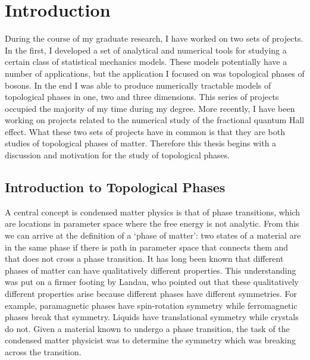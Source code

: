\chapter{Introduction}

During the course of my graduate research, I have worked on two sets of projects. In the first, I developed a set of analytical and numerical tools for studying a certain class of statistical mechanics models. These models potentially have a number of applications, but the application I focused on was topological phases of bosons. In the end I was able to produce numerically tractable models of topological phases in one, two and three dimensions. This series of projects occupied the majority of my time during my degree. 
More recently, I have been working on projects related to the numerical study of the fractional quantum Hall effect. What these two sets of projects have in common is that they are both studies of topological phases of matter. Therefore this thesis begins with a discussion and motivation for the study of topological phases.

\section{Introduction to Topological Phases}

A central concept is condensed matter physics is that of phase transitions, which are locations in parameter space where the free energy is not analytic. From this we can arrive at the definition of a `phase of matter': two states of a material are in the same phase if there is path in parameter space that connects them and that does not cross a phase transition. It has long been known that different phases of matter can have qualitatively different properties. This understanding was put on a firmer footing by Landau\cite{Wen_book}, who pointed out that these qualitatively different properties arise because different phases have different symmetries.  For example, paramagnetic phases have spin-rotation symmetry while ferromagnetic phases break that symmetry. Liquids have translational symmetry while crystals do not. Given a material known to undergo a phase transition, the task of the condensed matter physicist was to determine the symmetry which was breaking across the transition.



